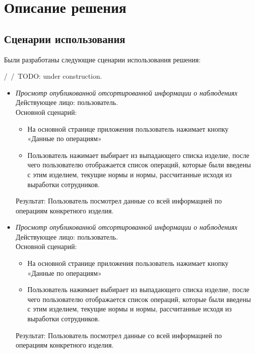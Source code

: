 
\section{Описание решения}

\subsection{Сценарии использования}

\tab
Были разработаны следующие сценарии использования решения:

/\ /\ TODO: under construction.

\begin{itemize}[topsep=0pt, parsep=0pt, itemsep=0pt, wide=0.5cm]
	\item \textit{Просмотр опубликованной отсортированной информации о наблюдениях} \\
	Действующее лицо: пользователь. \\
	Основной сценарий:
	\begin{itemize}[topsep=0pt, parsep=0pt, itemsep=0pt, wide=0.5cm]
		\item На основной странице приложения пользователь нажимает кнопку «Данные по операциям»
		\item Пользователь нажимает выбирает из выпадающего списка изделие, после чего пользователю отображается список операций, которые были введены с этим изделием, текущие нормы и нормы, рассчитанные исходя из выработки сотрудников.
	\end{itemize}
	Результат: Пользователь посмотрел данные со всей информацией по операциям конкретного изделия.
	\item \textit{Просмотр опубликованной отсортированной информации о наблюдениях} \\
	Действующее лицо: пользователь. \\
	Основной сценарий:
	\begin{itemize}[topsep=0pt, parsep=0pt, itemsep=0pt, wide=0.5cm]
		\item На основной странице приложения пользователь нажимает кнопку «Данные по операциям»
		\item Пользователь нажимает выбирает из выпадающего списка изделие, после чего пользователю отображается список операций, которые были введены с этим изделием, текущие нормы и нормы, рассчитанные исходя из выработки сотрудников.
	\end{itemize}
	Результат: Пользователь посмотрел данные со всей информацией по операциям конкретного изделия.
\end{itemize} 
